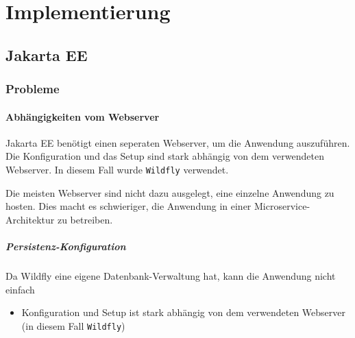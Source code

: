 \chapter{Implementierung}

\section{Jakarta EE}

\subsection{Probleme}

\subsubsection*{Abhängigkeiten vom Webserver}

Jakarta EE benötigt einen seperaten Webserver, um die Anwendung auszuführen. 
Die Konfiguration und das Setup sind stark abhängig von dem verwendeten Webserver. 
In diesem Fall wurde \texttt{Wildfly} verwendet.

Die meisten Webserver sind nicht dazu ausgelegt, eine einzelne Anwendung zu hosten.
Dies macht es schwieriger, die Anwendung in einer Microservice-Architektur zu betreiben.

\paragraph{Persistenz-Konfiguration}

Da Wildfly eine eigene Datenbank-Verwaltung hat, kann die Anwendung nicht einfach

\begin{itemize}
    \item Konfiguration und Setup ist stark abhängig von dem verwendeten Webserver (in diesem Fall \texttt{Wildfly})
\end{itemize}
